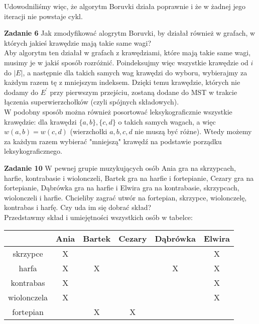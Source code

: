 \documentclass[a4paper,12pt]{article}
\newcommand{\abs}[1]{\left| #1 \right|}					%
\begin{document}
\noindent Udowodniliśmy więc, że algorytm Boruvki działa poprawnie i że w żadnej
jego iteracji nie powstaje cykl.


\newpage
\noindent \textbf{Zadanie 6} \newline
Jak zmodyfikować alogrytm Boruvki, by działał również w grafach, w których
jakieś krawędzie mają takie same wagi? \\

\noindent Aby algorytm ten działał w grafach z krawędziami, które mają takie same
wagi, musimy je w jakiś sposób rozróżnić. Poindeksujmy więc wszystkie
krawędzie od $i$ do $\abs{E}$, a następnie dla takich samych wag krawędzi
do wyboru, wybierajmy za każdym razem tę z mniejszym indeksem. Dzięki temu
krawędzie, których nie dodamy do $E^\prime$ przy pierwszym przejściu, zostaną
dodane do MST w trakcie łączenia superwierzchołków (czyli spójnych składowych). \\

\noindent W podobny sposób można również posortować leksykograficznie wszystkie
krawędzie: dla krawędzi $\{ a, b \}, \{ c, d\}$ o takich samych wagach, a więc 
$w(a,b) = w(c,d)$ (wierzchołki $a, b, c, d$ nie muszą być różne). Wtedy możemy
za każdym razem wybierać "mniejszą" krawędź na podstawie porządku leksykograficznego.

\noindent \newline \textbf{Zadanie 10} \newline
W pewnej grupie muzykujących osób Ania gra na skrzypcach, harfie, kontrabasie
i wiolonczeli, Bartek gra na harfie i fortepianie, Cezary gra na fortepianie,
Dąbrówka gra na harfie i Elwira gra na kontrabasie, skrzypcach, wiolonczeli i harfie.
Chcieliby zagrać utwór na fortepian, skrzypce, wiolonczelę, kontrabas i harfę.
Czy uda im się dobrać skład? \\

\noindent Przedstawmy skład i umiejętności wszystkich osób w tabelce:
\begin{table}[H]
    \centering
    \begin{tabular}{c|c|c|c|c|c|}
    \cline{2-6}
                                      & Ania & Bartek & Cezary & Dąbrówka & Elwira \\ \hline
    \multicolumn{1}{|c|}{skrzypce}    & X    &        &        &          & X      \\ \hline
    \multicolumn{1}{|c|}{harfa}       & X    & X      &        & X        & X      \\ \hline
    \multicolumn{1}{|c|}{kontrabas}   & X    &        &        &          & X      \\ \hline
    \multicolumn{1}{|c|}{wiolonczela} & X    &        &        &          & X      \\ \hline
    \multicolumn{1}{|c|}{fortepian}   &      & X      & X      &          &        \\ \hline
    \end{tabular}
\end{table}
\end{document}
